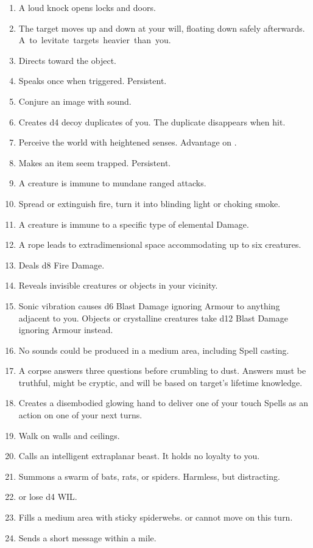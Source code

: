 \documentclass[itdr]{subfiles}
\begin{document}
\begin{enumerate}
	\item {} A loud knock opens locks and doors.
	\item {} The target moves up and down at your will, floating down safely afterwards. \mbox{A  to levitate targets heavier than you.}
	\item {} Directs toward the object.
	\item {} Speaks once when triggered. Persistent.
	\item {} Conjure an image with sound.
	\item {} Creates d4 decoy duplicates of you. The duplicate disappears when hit.
	\item {} Perceive the world with heightened senses. Advantage on .
	\item {} Makes an item seem trapped. Persistent.
	\item {} A creature is immune to mundane ranged attacks.
	\item {} Spread or extinguish fire, turn it into blinding light or choking smoke.
	\item {} A creature is immune to a specific type of elemental Damage.
	\item {} A rope leads to extradimensional space accommodating up to six creatures.
	\item {} Deals d8 Fire Damage.
	\item {} Reveals invisible creatures or objects in your vicinity.
	\item {} Sonic vibration causes d6 Blast Damage ignoring Armour to anything adjacent to you. Objects or crystalline creatures take d12 Blast Damage ignoring Armour instead.
	\item {} No sounds could be produced in a medium area, including Spell casting.
	\item {} A corpse answers three questions before crumbling to dust. Answers must be truthful, might be cryptic, and will be based on target's lifetime knowledge.
	\item {} Creates a disembodied glowing hand to deliver one of your touch Spells as an action on one of your next turns.
	\item {} Walk on walls and ceilings.
	\item {} Calls an intelligent extraplanar beast. It holds no loyalty to you.
	\item {} Summons a swarm of bats, rats, or spiders. Harmless, but distracting.
	\item {}  or lose d4 WIL.
	\item {} Fills a medium area with sticky spiderwebs.  or cannot move on this turn.
	\item {} Sends a short message within a mile.
\end{enumerate}
\end{document}
